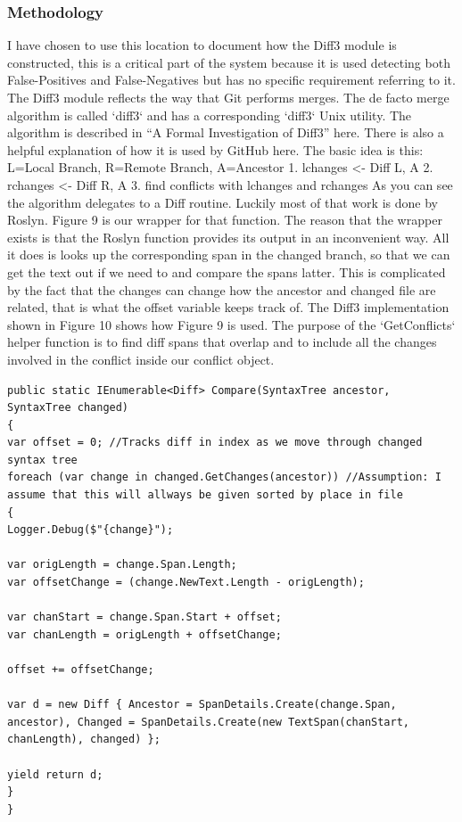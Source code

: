 \documentclass[10pt,draftclsnofoot,onecolumn]{IEEEtran}
\begin{document}
\subsubsection{Methodology}
I have chosen to use this location to document how the Diff3 module is constructed, this is a critical part of the system because it is used detecting both False-Positives and False-Negatives but has no specific requirement referring to it.
The Diff3 module reflects the way that Git performs merges. The de facto merge algorithm is called `diff3` and has a corresponding `diff3` Unix utility. The algorithm is described in “A Formal Investigation of Diff3” here. There is also a helpful explanation of how it is used by GitHub here.
The basic idea is this: L=Local Branch, R=Remote Branch, A=Ancestor
1.	lchanges <- Diff L, A
2.	rchanges <- Diff R, A
3.	find conflicts with lchanges and rchanges
As you can see the algorithm delegates to a Diff routine. Luckily most of that work is done by Roslyn. Figure 9 is our wrapper for that function. The reason that the wrapper exists is that the Roslyn function provides its output in an inconvenient way. All it does is looks up the corresponding span in the changed branch, so that we can get the text out if we need to and compare the spans latter. This is complicated by the fact that the changes can change how the ancestor and changed file are related, that is what the offset variable keeps track of. The Diff3 implementation shown in Figure 10 shows how Figure 9 is used. The purpose of the `GetConflicts` helper function is to find diff spans that overlap and to include all the changes involved in the conflict inside our conflict object.

\begingroup
\begin{lstlisting}
public static IEnumerable<Diff> Compare(SyntaxTree ancestor, SyntaxTree changed)
{
var offset = 0; //Tracks diff in index as we move through changed syntax tree
foreach (var change in changed.GetChanges(ancestor)) //Assumption: I assume that this will allways be given sorted by place in file
{
Logger.Debug($"{change}");

var origLength = change.Span.Length;
var offsetChange = (change.NewText.Length - origLength);

var chanStart = change.Span.Start + offset;
var chanLength = origLength + offsetChange;

offset += offsetChange;

var d = new Diff { Ancestor = SpanDetails.Create(change.Span, ancestor), Changed = SpanDetails.Create(new TextSpan(chanStart, chanLength), changed) };

yield return d;
}
}
\end{lstlisting}
\endgroup
\end{document}
